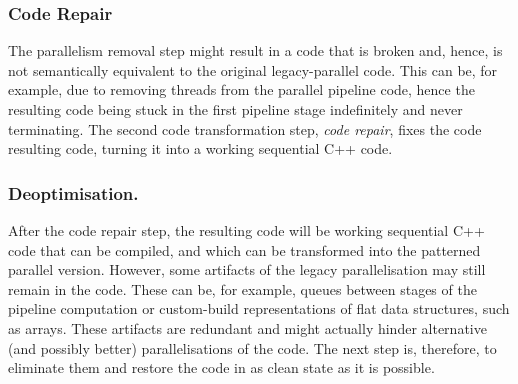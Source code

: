 \subsubsection{Code Repair}
The parallelism removal step might result in a code that is broken and, hence, is not semantically equivalent to the original legacy-parallel code. This can be, for example, due to removing threads from the parallel pipeline code, hence the resulting code being stuck in the first pipeline stage indefinitely and never terminating. The second code transformation step, \emph{code repair}, fixes the code resulting code, turning it into a working sequential C++ code.

\subsubsection{Deoptimisation.}
After the code repair step, the resulting code will be working sequential C++ code that can be compiled, and which can be transformed into the patterned parallel version. However, some artifacts of the legacy parallelisation may still remain in the code. These can be, for example, queues between stages of the pipeline computation or custom-build representations of flat data structures, such as arrays. These artifacts are redundant and might actually hinder alternative (and possibly better) parallelisations of the code. The next step is, therefore, to eliminate them and restore the code in as clean state as it is possible.



